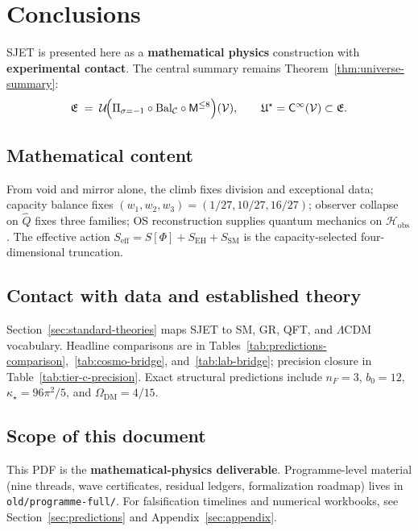 \documentclass[aps,prd,onecolumn,amsmath,amssymb,nofootinbib,11pt]{revtex4-2}
\numberwithin{equation}{section}
\theoremstyle{plain}
\theoremstyle{definition}
\theoremstyle{remark}
\newcommand{\Void}{\mathcal{V}}
\newcommand{\Mirror}{\mathsf{M}}
\newcommand{\Climb}{\mathsf{C}}
\newcommand{\orderparam}{\Phi}
\begin{document}
\section{Conclusions}
\label{sec:conclusions}

SJET is presented here as a \textbf{mathematical physics} construction with
\textbf{experimental contact}. The central summary remains
Theorem~\ref{thm:universe-summary}:
\begin{equation}
  \mathfrak{E}
  \;=\;
  \mathcal{U}\!\Bigl(
    \Pi_{\sigma=-1}\circ\mathrm{Bal}_{\mathcal{C}}\circ\Mirror^{\leq 8}
  \Bigr)(\Void),
  \qquad
  \mathfrak{U}^\star=\Climb^\infty(\Void)\subset\mathfrak{E}.
\end{equation}

\subsection{Mathematical content}

From void and mirror alone, the climb fixes division and exceptional data;
capacity balance fixes $(w_1,w_2,w_3)=(1/27,10/27,16/27)$; observer collapse
on $\hat Q$ fixes three families; OS reconstruction supplies quantum mechanics
on $\mathcal{H}_{\mathrm{obs}}$. The effective action
$S_{\mathrm{eff}}=S[\orderparam]+S_{\mathrm{EH}}+S_{\mathrm{SM}}$ is the
capacity-selected four-dimensional truncation.

\subsection{Contact with data and established theory}

Section~\ref{sec:standard-theories} maps SJET to SM, GR, QFT, and $\Lambda$CDM
vocabulary. Headline comparisons are in
Tables~\ref{tab:predictions-comparison},~\ref{tab:cosmo-bridge},
and~\ref{tab:lab-bridge}; precision closure in
Table~\ref{tab:tier-c-precision}. Exact structural predictions include
$n_F=3$, $b_0=12$, $\kappa_\star=96\pi^2/5$, and $\Omega_{\mathrm{DM}}=4/15$.

\subsection{Scope of this document}

This PDF is the \textbf{mathematical-physics deliverable}. Programme-level
material (nine threads, wave certificates, residual ledgers, formalization
roadmap) lives in \texttt{old/programme-full/}. For falsification timelines
and numerical workbooks, see Section~\ref{sec:predictions} and
Appendix~\ref{sec:appendix}.
\end{document}
